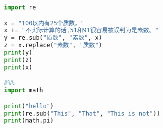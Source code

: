 \begin{spacing}{0.8}
\begin{small}
\begin{lstlisting}[language=Python]
import re

x = "100以内有25个质数。"
x += "不实际计算的话,51和91很容易被误判为是素数。"
y = re.sub("质数", "素数", x)
z = x.replace("素数", "质数")
print(y)
print(z)
print(x)

#%%
import math

print("hello")
print(re.sub("This", "That", "This is not"))
print(math.pi)
\end{lstlisting}
\end{small}
\end{spacing}
